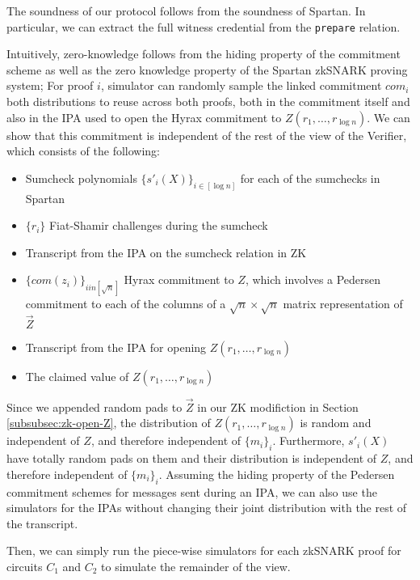 The soundness of our protocol follows from the soundness of Spartan. In particular, we can extract the full witness credential from the \texttt{prepare} relation.

Intuitively, zero-knowledge follows from the hiding property of the commitment scheme as well as the zero knowledge property of the Spartan zkSNARK proving system;
For proof $i$, simulator can randomly sample the linked commitment $com_i$ both distributions to reuse across both proofs, both in the commitment itself and also in the IPA used to open the Hyrax commitment to $Z(r_1, \dots, r_{\log{n}})$. 
We can show that this commitment is independent of the rest of the view of the Verifier, which consists of the following:

\begin{itemize}
    \item Sumcheck polynomials $\{s'_i(X)\}_{i \in [\log n]}$ for each of the sumchecks in Spartan
    \item $\{r_i\}$ Fiat-Shamir challenges during the sumcheck
    \item Transcript from the IPA on the sumcheck relation in ZK
    \item $\{com(z_i)\}_{i in [\sqrt{n}]}$ Hyrax commitment to $Z$, which involves a Pedersen commitment to each of the columns of a $\sqrt{n} \times \sqrt{n}$ matrix representation of $\vec{Z}$
    \item Transcript from the IPA for opening $Z(r_1, \dots, r_{\log n})$
    \item The claimed value of $Z(r_1, \dots, r_{\log n})$
\end{itemize}

Since we appended random pads to $\vec{Z}$ in our ZK modifiction in Section \ref{subsubsec:zk-open-Z}, the distribution of $Z(r_1, \dots, r_{\log n})$ is random and independent of $Z$, and therefore independent of $\{m_i\}_i$.
Furthermore, $s'_i(X)$ have totally random pads on them and their distribution is independent of $Z$, and therefore independent of $\{m_i\}_i$.
Assuming the hiding property of the Pedersen commitment schemes for messages sent during an IPA, we can also use the simulators for the IPAs without changing their joint distribution with the rest of the transcript.

Then, we can simply run the piece-wise simulators for each zkSNARK proof for circuits $C_1$ and $C_2$ to simulate the remainder of the view. 


